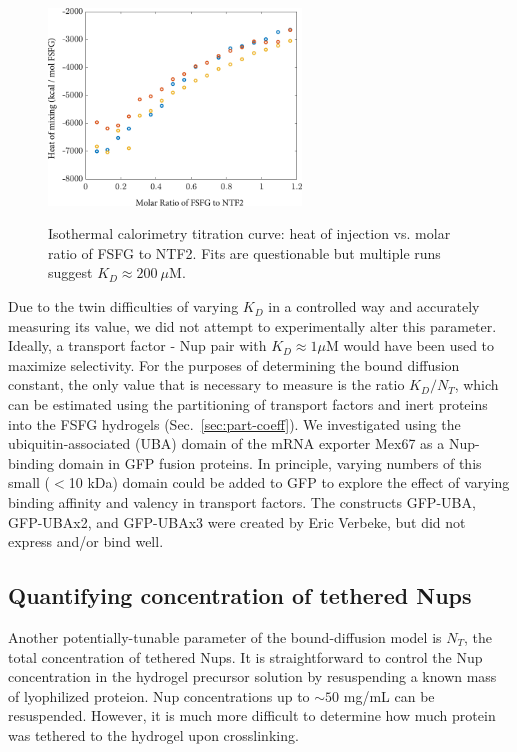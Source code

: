 \begin{figure}
\caption[Isothermal titration calorimetry with NTF2 and FSFG.]{Isothermal calorimetry titration curve: heat of injection vs. molar ratio of FSFG to NTF2. Fits are questionable but multiple runs suggest $K_D \approx 200\ \mu$M.\\}
\centering
\includegraphics[width=0.6\textwidth]{figs/ch04/ITC_runs}
\label{fig:ITC-runs}
\end{figure} 

Due to the twin difficulties of varying $K_D$ in a controlled way and accurately measuring its value, we did not attempt to experimentally alter this parameter.  Ideally, a transport factor - Nup pair with $K_D \approx 1 \mu$M would have been used to maximize selectivity.  For the purposes of determining the bound diffusion constant, the only value that is necessary to measure is the ratio $K_D/N_T$, which can be estimated using the partitioning of transport factors and inert proteins into the FSFG hydrogels (Sec.~\ref{sec:part-coeff}).  We investigated using the ubiquitin-associated (UBA) domain of the mRNA exporter Mex67 as a Nup-binding domain in GFP fusion proteins.  In principle, varying numbers of this small ($<$10 kDa) domain could be added to GFP to explore the effect of varying binding affinity and valency in transport factors.  The constructs GFP-UBA, GFP-UBAx2, and GFP-UBAx3 were created by Eric Verbeke, but did not express and/or bind well.


\subsection{Quantifying concentration of tethered Nups}

Another potentially-tunable parameter of the bound-diffusion model is $N_T$, the total concentration of tethered Nups.  It is straightforward to control the Nup concentration in the hydrogel precursor solution by resuspending a known mass of lyophilized proteion.  Nup concentrations up to $\sim 50$ mg/mL can be resuspended.  However, it is much more difficult to determine how much protein was tethered to the hydrogel upon crosslinking. 

